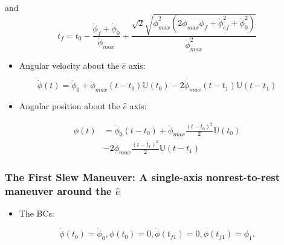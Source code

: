 \documentclass[letterpaper, preprint, paper,11pt]{AAS}	%
\begin{document}
			
			and
			\begin{equation}
				t_f=t_0-\frac{\dot{\phi}_{f}+\dot{\phi}_{0}}{\ddot{\phi}_{max}}+\frac{\sqrt{2}\sqrt{\ddot{\phi}_{max}^2(2\ddot{\phi}_{max}\phi_{f}+\dot{\phi}_{ef}^2+\dot{\phi}_{0}^2)}}{\ddot{\phi}_{max}^2}
			\end{equation}
			\begin{itemize}
				\item Angular velocity about the $\hat{e}$ axis:
			\end{itemize}
			\begin{equation}\label{omega}
				\dot{\phi}(t)=\dot{\phi}_{0}+\ddot{\phi}_{max}(t-t_0)\mathbb{U}(t_0)- 2\ddot{\phi}_{max}(t-t_1)\mathbb{U}(t-t_1)
			\end{equation}
			\begin{itemize}
				\item Angular position about the $\hat{e}$ axis:
			\end{itemize}
			\begin{equation}\label{phi}
				\begin{split}
				\phi(t)&=\dot{\phi}_{0}(t-t_0)+\ddot{\phi}_{max}\frac{(t-t_0)^2}{2}\mathbb{U}(t_0)\\
				&- 2\ddot{\phi}_{max}\frac{(t-t_1)^2}{2}\mathbb{U}(t-t_1)
				\end{split}
			\end{equation}
			

			\subsubsection{The First Slew Maneuver: A single-axis nonrest-to-rest maneuver around the $\hat{e}$}
			
			\begin{itemize}
				\item The BCs: 
			\end{itemize}
			\begin{equation}\label{Bc1}
			\dot{\phi}(t_0)=\dot{\phi}_{0},\phi(t_0)=0, \dot{\phi}(t_{f1})=0,\phi(t_{f1})=\phi_1.
			\end{equation}
			
\end{document}
